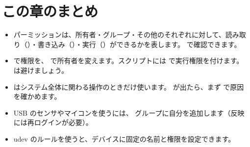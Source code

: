 \section*{この章のまとめ}

\begin{itemize}
  \item パーミッションは、所有者・グループ・その他のそれぞれに対して、読み取り（）・書き込み（）・実行（）ができるかを表します。 で確認できます。
  \item {} で権限を、 で所有者を変えます。スクリプトには  で実行権限を付けます。 は避けましょう。
  \item {} はシステム全体に関わる操作のときだけ使います。 が出たら、まず  で原因を確かめます。
  \item USB のセンサやマイコンを使うには、 グループに自分を追加します（反映には再ログインが必要）。
  \item udev のルールを使うと、デバイスに固定の名前と権限を設定できます。
\end{itemize}
